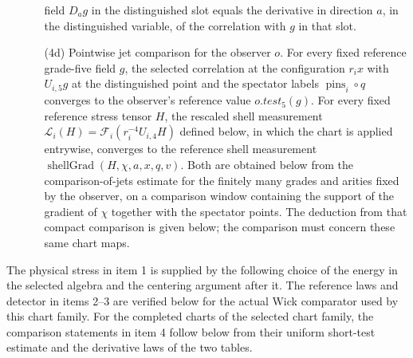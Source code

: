 \begin{enumerate}
\begin{enumerate}
  field $D_a g$ in the distinguished slot equals the derivative in
  direction $a$, in the distinguished variable, of the correlation with
  $g$ in that slot.
 \item[(4d)] Pointwise jet comparison for the observer $o$. For every
  fixed reference grade-five field $g$, the selected correlation at the
  configuration $r_ix$ with $U_{i,5}g$ at the distinguished point and
  the spectator labels $\operatorname{pins}_i\circ q$ converges to the
  observer's reference value $o.test_5(g)$. For every fixed reference
  stress tensor $H$, the rescaled shell measurement
  $\mathcal L_i(H)=\mathscr F_i(r_i^{-4}U_{i,4}H)$ defined below, in
  which the chart is applied entrywise, converges to the reference shell
  measurement $\operatorname{shellGrad}(H,\chi,a,x,q,v)$. Both are
  obtained below from the comparison-of-jets estimate for the finitely
  many grades and arities fixed by the observer, on a comparison window
  containing the support of the gradient of $\chi$ together with the
  spectator points. The deduction from that compact comparison is given
  below; the comparison must concern these same chart maps.
 \end{enumerate}
\end{enumerate}
The physical stress in item 1 is supplied by the following choice of the
energy in the selected algebra and the centering argument after it.
The reference laws and detector in items 2--3 are verified below for
the actual Wick comparator used by this chart family.
For the completed charts of the selected chart family, the comparison
statements in item 4 follow below from their uniform short-test estimate
and the derivative laws of the two tables.

